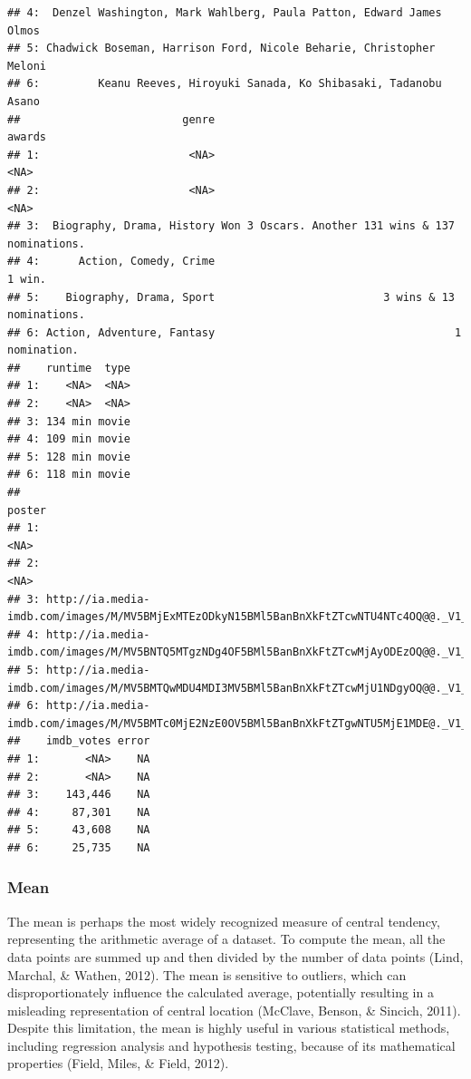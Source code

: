 \documentclass[
  b5paper]{book}
\begin{document}
\begin{verbatim}
## 4:  Denzel Washington, Mark Wahlberg, Paula Patton, Edward James Olmos
## 5: Chadwick Boseman, Harrison Ford, Nicole Beharie, Christopher Meloni
## 6:         Keanu Reeves, Hiroyuki Sanada, Ko Shibasaki, Tadanobu Asano
##                         genre                                            awards
## 1:                       <NA>                                              <NA>
## 2:                       <NA>                                              <NA>
## 3:  Biography, Drama, History Won 3 Oscars. Another 131 wins & 137 nominations.
## 4:      Action, Comedy, Crime                                            1 win.
## 5:    Biography, Drama, Sport                          3 wins & 13 nominations.
## 6: Action, Adventure, Fantasy                                     1 nomination.
##    runtime  type
## 1:    <NA>  <NA>
## 2:    <NA>  <NA>
## 3: 134 min movie
## 4: 109 min movie
## 5: 128 min movie
## 6: 118 min movie
##                                                                                              poster
## 1:                                                                                             <NA>
## 2:                                                                                             <NA>
## 3: http://ia.media-imdb.com/images/M/MV5BMjExMTEzODkyN15BMl5BanBnXkFtZTcwNTU4NTc4OQ@@._V1_SX300.jpg
## 4: http://ia.media-imdb.com/images/M/MV5BNTQ5MTgzNDg4OF5BMl5BanBnXkFtZTcwMjAyODEzOQ@@._V1_SX300.jpg
## 5: http://ia.media-imdb.com/images/M/MV5BMTQwMDU4MDI3MV5BMl5BanBnXkFtZTcwMjU1NDgyOQ@@._V1_SX300.jpg
## 6: http://ia.media-imdb.com/images/M/MV5BMTc0MjE2NzE0OV5BMl5BanBnXkFtZTgwNTU5MjE1MDE@._V1_SX300.jpg
##    imdb_votes error
## 1:       <NA>    NA
## 2:       <NA>    NA
## 3:    143,446    NA
## 4:     87,301    NA
## 5:     43,608    NA
## 6:     25,735    NA
\end{verbatim}

\hypertarget{mean}{%
\subsubsection*{Mean}\label{mean}}

The mean is perhaps the most widely recognized measure of central tendency, representing the arithmetic average of a dataset. To compute the mean, all the data points are summed up and then divided by the number of data points (Lind, Marchal, \& Wathen, 2012). The mean is sensitive to outliers, which can disproportionately influence the calculated average, potentially resulting in a misleading representation of central location (McClave, Benson, \& Sincich, 2011). Despite this limitation, the mean is highly useful in various statistical methods, including regression analysis and hypothesis testing, because of its mathematical properties (Field, Miles, \& Field, 2012).
\end{document}
